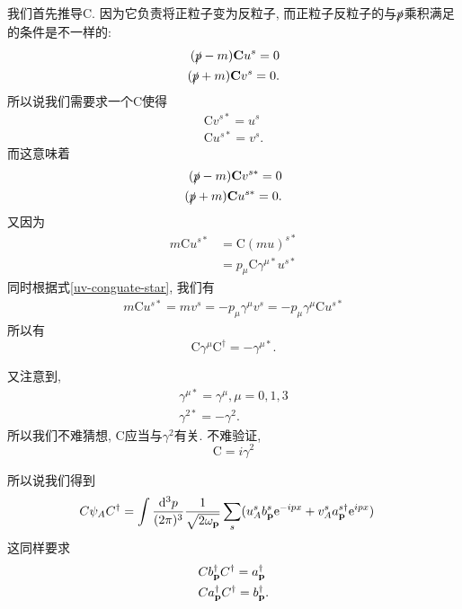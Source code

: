 \begin{example}[Dirac旋量的电荷共轭变换]
    我们首先推导$\boldsymbol{\mathrm C}$. 因为它负责将正粒子变为反粒子, 而正粒子反粒子的与$\slashed p$乘积满足的条件是不一样的:
    \begin{align}
        (\slashed p-m)\boldsymbol{\mathrm C}u^{s}=0\\
        (\slashed p+m)\boldsymbol{\mathrm C}v^{s}=0.
    \end{align}
    所以说我们需要求一个$\boldsymbol{\mathrm C}$使得
    \begin{align}
        \boldsymbol{\mathrm C}v^{s*}=u^s\\
        \boldsymbol{\mathrm C}u^{s*}=v^s\label{uv-conguate-star}.
    \end{align}
    而这意味着
    \begin{align}
        (\slashed p-m)\boldsymbol{\mathrm C}v^{s*}=0\\
        (\slashed p+m)\boldsymbol{\mathrm C}u^{s*}=0.
    \end{align}
    又因为
    \begin{align}
        m\boldsymbol{\mathrm C}u^{s*}&=\boldsymbol{\mathrm C}(mu)^{s*}\\
        &=p_\mu\boldsymbol{\mathrm C}\gamma^{\mu*} u^{s*}
    \end{align}
    同时根据式\eqref{uv-conguate-star}, 我们有
    \begin{align}
        m\boldsymbol{\mathrm C}u^{s*}=mv^s=-p_\mu\gamma^\mu v^s=-p_\mu\gamma^\mu\boldsymbol{\mathrm C}u^{s*}
    \end{align}
    所以有
    \begin{equation}
        \boldsymbol{\mathrm C}\gamma^\mu\boldsymbol{\mathrm C}^\dagger=-\gamma^{\mu*}.
    \end{equation}

    又注意到, 
    \begin{align}
        \gamma^{\mu*}=\gamma^\mu, \mu=0,1,3\\
        \gamma^{2*}=-\gamma^2.
    \end{align}
    所以我们不难猜想, $\boldsymbol{\mathrm C}$应当与$\gamma^2$有关. 不难验证,
    \begin{equation}
        \boldsymbol{\mathrm C}=i\gamma^2
    \end{equation}

    所以说我们得到
    \begin{align}
        &C\psi_AC^\dagger=\int\ldsq{p}\sum_s(u^s_A\b{p}^s\exp{-ipx}+v^{s}_A\a{p}^{s\dagger}\exp{ipx})
    \end{align}
    这同样要求
    \begin{align}
        & Cb_{\mathbf{p}}^\dagger C^\dagger=a_{\mathbf{p}}^\dagger\\
        & Ca_{\mathbf{p}}^\dagger C^\dagger=b_{\mathbf{p}}^\dagger.
    \end{align}

\end{example}

